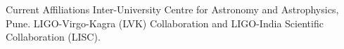 \begin{rubric}{Current Affiliations}
%
	Inter-University Centre for Astronomy and Astrophysics, Pune.
%
%
%
	LIGO-Virgo-Kagra (LVK) Collaboration and LIGO-India Scientific Collaboration (LISC).
%
\end{rubric}
